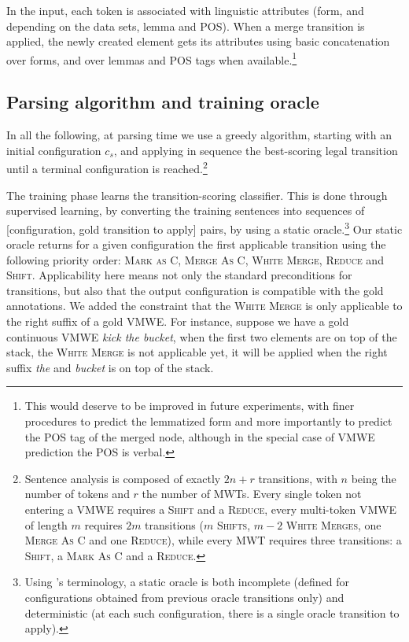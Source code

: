 \documentclass[output=paper,modfonts]{langscibook}
\begin{document}
In the input, each token is associated with linguistic attributes (form, and depending on the data sets, lemma and POS). When a merge transition is applied, the newly created element gets its attributes using basic concatenation over forms, and over lemmas and POS tags when available.\footnote{This would deserve to be improved in future experiments, with finer procedures to predict the lemmatized form and more importantly to predict the POS tag of the merged node, although in the special case of VMWE prediction the POS is verbal.}
\subsection{Parsing algorithm and training oracle}
In all the following, at parsing time we use a greedy algorithm, starting with an initial configuration $c_s$, and applying in sequence the best-scoring legal transition until a terminal configuration is reached.\footnote{Sentence analysis is composed of exactly $2n + r$ transitions, with $n$ being the number of tokens and $r$ the number of MWTs. Every single token not entering a VMWE requires a \textsc{Shift} and a \textsc{Reduce}, every multi-token VMWE of length $m$ requires $2m$ transitions ($m$ \textsc{Shifts}, $m-2$ \textsc{White Merges}, one \textsc{Merge As C} and one \textsc{Reduce}), while every MWT requires three transitions: a \textsc{Shift}, a \textsc{Mark As C} and a \textsc{Reduce}.}

The training phase learns the transition-scoring classifier. This is done through supervised learning, by converting the training sentences into sequences of [configuration, gold transition to apply] pairs, by using a static oracle.\footnote{Using \citep{goldberg2013training}'s terminology, a static oracle is both incomplete (defined for configurations obtained from previous oracle transitions only) and deterministic (at each such configuration, there is a single oracle transition to apply).} Our static oracle returns for a given configuration the first applicable transition using the following priority order: \textsc{Mark as C, Merge As C, White Merge, Reduce} and \textsc{Shift}. Applicability here means not only the standard preconditions for transitions, but also that the output configuration is compatible with the gold annotations. We added the constraint that the {\textsc{White Merge}} is only applicable to the right suffix of a gold VMWE. For instance, suppose we have a gold continuous VMWE \textit{kick the bucket}, when the first two elements are on top of the stack, the \textsc{White Merge} is not applicable yet, it will be applied when the right suffix \textit{the} and \textit{bucket} is on top of the stack.\\
\end{document}
